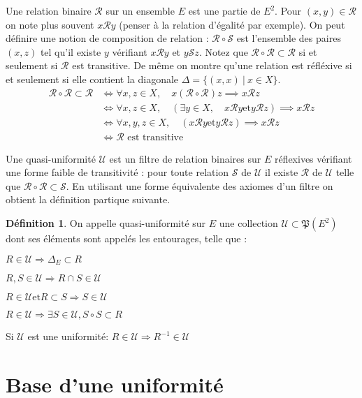 \documentclass[a4paper, 11pt, french]{book}
\newenvironment{itemise}{\itemize}{\enditemize}
\theoremstyle{plain} %
\theoremstyle{definition} %
\newtheorem{definition}{Définition}
\theoremstyle{remark} %
\newcommand{\1}{\mathds{1}}
\newcommand{\inv}[1]{#1^{-1}}
\newcommand{\et}{\mathrel{\mathrm{et}}}
\renewcommand{\cal}[1]{\mathcal{#1}}
\renewcommand{\frak}[1]{\mathfrak{#1}}
\newcommand{\scr}[1]{\mathscr{#1}}
\newcommand\ens[2]{\{#1 \ |\ #2\}}
\begin{document}
Une relation binaire $\cal{R}$ sur un ensemble $E$ est une partie de $E^2$.
Pour $(x, y)\in\cal{R}$ on note plus souvent $x\cal{R}y$ (penser à la relation d'égalité par exemple).
On peut définire une notion de composition de relation : $\cal{R}\circ\cal{S}$ est l'ensemble des paires $(x, z)$ tel qu'il existe $y$ vérifiant $x\cal{R}y$ et $y\cal{S}z$.
Notez que $\cal{R}\circ\cal{R}\subset\cal{R}$ si et seulement si $\cal{R}$ est transitive.
De même on montre qu'une relation est réfléxive si et seulement si elle contient la diagonale $\Delta=\ens{(x, x)}{x\in X}$.
\begin{align*}
	\cal{R}\circ\cal{R}\subset\cal{R}
	&\iff \forall x, z\in X, \quad x(\cal{R}\circ\cal{R})z\implies x\cal{R}z \\
	&\iff \forall x, z\in X, \quad (\exists y\in X, \quad x\cal{R}y\et y\cal{R}z) \implies x\cal{R}z \\
	&\iff \forall x, y, z\in X, \quad (x\cal{R}y\et y\cal{R}z) \implies x\cal{R}z \\	
	&\iff \text{$\cal{R}$ est transitive}
\end{align*}

Une quasi-uniformité $\scr{U}$ est un filtre de relation binaires sur $E$ réflexives vérifiant une forme faible de transitivité :
pour toute relation $\cal{S}$ de $\scr{U}$ il existe $\cal{R}$ de $\scr{U}$ telle que $\cal{R}\circ\cal{R}\subset\cal{S}$.
En utilisant une forme équivalente des axiomes d'un filtre on obtient la définition partique suivante.
\begin{definition}
	On appelle quasi-uniformité sur $E$ une collection $\scr{U}\subset\frak{P}(E^2)$ dont ses éléments sont appelés les entourages, telle que :
	\begin{itemise}
		\item $R\in\scr{U}\Rightarrow\Delta_E\subset R$
		\item $R, S\in\scr{U}\Rightarrow R\cap S\in\scr{U}$
		\item $R\in\scr{U}\et R\subset S\Rightarrow S\in\scr{U}$
		\item $R\in\scr{U}\Rightarrow\exists S\in\scr{U}, S\circ S\subset R$
		\item Si $\scr{U}$ est une uniformité: $R\in\scr{U}\Rightarrow\inv{R}\in\scr{U}$
	\end{itemise}
\end{definition}

\section{Base d'une uniformité}
\end{document}
